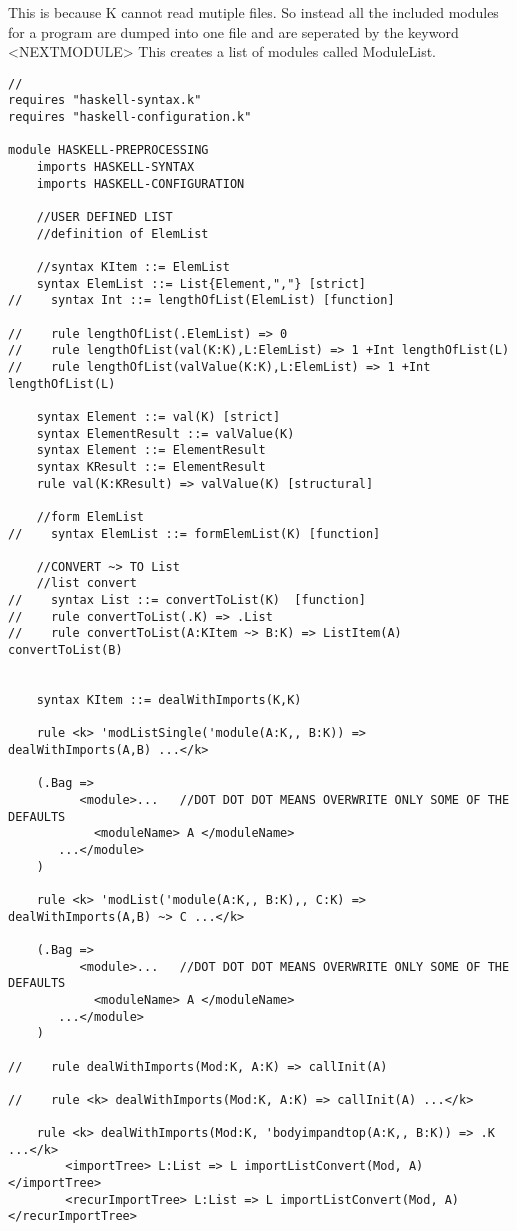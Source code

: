 This is because K cannot read mutiple files. So instead all the included modules for a program are dumped into one file and are seperated by the keyword <NEXTMODULE>
This creates a list of modules called ModuleList.

\begin{lstlisting}
//
requires "haskell-syntax.k"
requires "haskell-configuration.k"

module HASKELL-PREPROCESSING
    imports HASKELL-SYNTAX
    imports HASKELL-CONFIGURATION

    //USER DEFINED LIST
    //definition of ElemList

    //syntax KItem ::= ElemList
    syntax ElemList ::= List{Element,","} [strict]
//    syntax Int ::= lengthOfList(ElemList) [function]

//    rule lengthOfList(.ElemList) => 0
//    rule lengthOfList(val(K:K),L:ElemList) => 1 +Int lengthOfList(L)
//    rule lengthOfList(valValue(K:K),L:ElemList) => 1 +Int lengthOfList(L)

    syntax Element ::= val(K) [strict]
    syntax ElementResult ::= valValue(K)
    syntax Element ::= ElementResult
    syntax KResult ::= ElementResult
    rule val(K:KResult) => valValue(K) [structural]

    //form ElemList
//    syntax ElemList ::= formElemList(K) [function]

    //CONVERT ~> TO List
    //list convert
//    syntax List ::= convertToList(K)  [function]
//    rule convertToList(.K) => .List
//    rule convertToList(A:KItem ~> B:K) => ListItem(A) convertToList(B)


    syntax KItem ::= dealWithImports(K,K)

    rule <k> 'modListSingle('module(A:K,, B:K)) => dealWithImports(A,B) ...</k>

    (.Bag =>
          <module>...   //DOT DOT DOT MEANS OVERWRITE ONLY SOME OF THE DEFAULTS
    	    <moduleName> A </moduleName>
       ...</module>
    )

    rule <k> 'modList('module(A:K,, B:K),, C:K) => dealWithImports(A,B) ~> C ...</k>

    (.Bag =>
          <module>...   //DOT DOT DOT MEANS OVERWRITE ONLY SOME OF THE DEFAULTS
    	    <moduleName> A </moduleName>
       ...</module>
    )

//    rule dealWithImports(Mod:K, A:K) => callInit(A)

//    rule <k> dealWithImports(Mod:K, A:K) => callInit(A) ...</k>

    rule <k> dealWithImports(Mod:K, 'bodyimpandtop(A:K,, B:K)) => .K ...</k>
        <importTree> L:List => L importListConvert(Mod, A) </importTree>
        <recurImportTree> L:List => L importListConvert(Mod, A) </recurImportTree>


\end{lstlisting}
